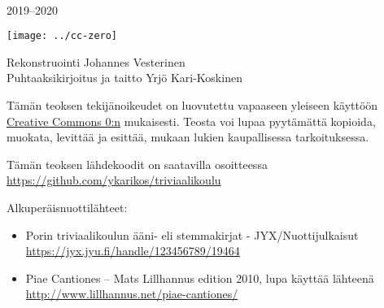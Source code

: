 \newpage
~\vfill
\thispagestyle{empty}
\setlength{\parindent}{0pt}
\setlength{\parskip}{\baselineskip}

2019–2020

\texttt{[image: ../cc-zero]}

Rekonstruointi Johannes Vesterinen \\
Puhtaaksikirjoitus ja taitto Yrjö Kari-Koskinen

Tämän teoksen tekijänoikeudet on luovutettu vapaaseen yleiseen käyttöön  \href{https://creativecommons.org/publicdomain/zero/1.0/deed.fi}{Creative Commons 0:n} mukaisesti. Teosta voi lupaa pyytämättä kopioida, muokata, levittää ja esittää, mukaan lukien kaupallisessa tarkoituksessa.

Tämän teoksen lähdekoodit on saatavilla osoitteessa \url{https://github.com/ykarikos/triviaalikoulu}

Alkuperäisnuottilähteet:
\begin{itemize}
\item Porin triviaalikoulun ääni- eli stemmakirjat - JYX/Nuottijulkaisut \\ \url{https://jyx.jyu.fi/handle/123456789/19464}
\item Piae Cantiones – Mats Lillhannus edition 2010, lupa käyttää lähteenä \\ \url{http://www.lillhannus.net/piae-cantiones/}
\end{itemize}

